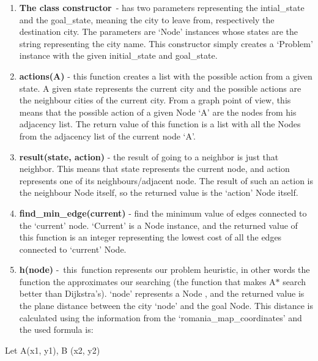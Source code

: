 \documentclass[12pt]{article}
\begin{document}
\begin{enumerate}
	\item \textbf{The class constructor}\ - has two  parameters representing the intial\_state and the goal\_state, meaning the city to leave from, respectively the destination city. The parameters are ‘Node’ instances whose states are the string representing the city name. This constructor simply creates a ‘Problem’ instance with the given initial\_state and goal\_state.\par

	\item \textbf{actions(A) }- this function creates a list with the possible action from a given state. A given state represents the current city and the possible actions are the neighbour cities of the current city. From a graph point of view, this means that the possible action of a given Node ‘A’ are the nodes from his adjacency list. The return value of this function is a list with all the Nodes from the adjacency list of the current node ‘A’.\tab \par

	\item \textbf{result(state, action)} - the result of going to a neighbor is just that neighbor. This means that state represents the current node, and action represents one of its neighbours/adjacent node. The result of such an action is the neighbour Node itself, so the returned value is the ‘action’ Node itself.\par

	\item \textbf{find\_min\_edge(current)} - find the minimum value of edges connected to the ‘current’ node. ‘Current’ is a Node instance, and the returned value of this function is an integer representing the lowest cost of all the edges connected to ‘current’ Node.\par

	\item \textbf{ h(node) }-\ this\ function represents our problem heuristic, in other words the function the approximates our searching (the function that makes A$\ast$  search better than Dijkstra’s). ‘node’  represents a Node , and the returned value is the plane distance between the city ‘node’ and the goal Node. This distance is calculated using the information  from the ‘romania\_map\_coordinates’ and the used formula is:
\end{enumerate}\par

\begin{adjustwidth}{1.0in}{0.0in}
\begin{justify}
Let A(x1, y1), B (x2, y2) 
\end{justify}\par

\end{adjustwidth}
\end{document}

